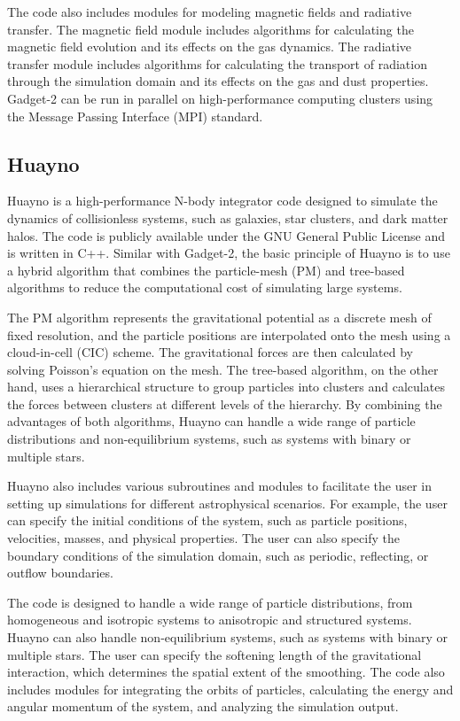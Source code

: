 The code also includes modules for modeling magnetic fields and radiative transfer. The magnetic field module includes algorithms for calculating the magnetic field evolution and its effects on the gas dynamics. The radiative transfer module includes algorithms for calculating the transport of radiation through the simulation domain and its effects on the gas and dust properties. Gadget-2 can be run in parallel on high-performance computing clusters using the Message Passing Interface (MPI) standard.


\subsection{Huayno}

Huayno \citep{pelupessy2012n} is a high-performance N-body integrator code designed to simulate the dynamics of collisionless systems, such as galaxies, star clusters, and dark matter halos. The code is publicly available under the GNU General Public License and is written in C++. Similar with Gadget-2, the basic principle of Huayno is to use a hybrid algorithm \citep{bode2000tree} that combines the particle-mesh (PM) \citep{klypin1983three} and tree-based algorithms \citep{barnes1986hierarchical,dehnen2000very} to reduce the computational cost of simulating large systems.


The PM algorithm represents the gravitational potential as a discrete mesh of fixed resolution, and the particle positions are interpolated onto the mesh using a cloud-in-cell (CIC) scheme. The gravitational forces are then calculated by solving Poisson's equation on the mesh. The tree-based algorithm, on the other hand, uses a hierarchical structure to group particles into clusters and calculates the forces between clusters at different levels of the hierarchy. By combining the advantages of both algorithms, Huayno can handle a wide range of particle distributions and non-equilibrium systems, such as systems with binary or multiple stars.


Huayno also includes various subroutines and modules to facilitate the user in setting up simulations for different astrophysical scenarios. For example, the user can specify the initial conditions of the system, such as particle positions, velocities, masses, and physical properties. The user can also specify the boundary conditions of the simulation domain, such as periodic, reflecting, or outflow boundaries.

The code is designed to handle a wide range of particle distributions, from homogeneous and isotropic systems to anisotropic and structured systems. Huayno can also handle non-equilibrium systems, such as systems with binary or multiple stars. The user can specify the softening length of the gravitational interaction, which determines the spatial extent of the smoothing. The code also includes modules for integrating the orbits of particles, calculating the energy and angular momentum of the system, and analyzing the simulation output.

